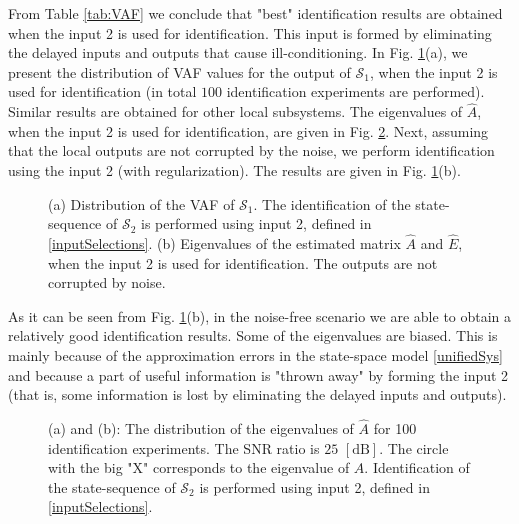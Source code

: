\documentclass[journal,10pt]{IEEEtran}
\begin{document}
From Table \ref{tab:VAF} we conclude that "best" identification results are obtained when the input 2 is used for identification. This input is formed by eliminating the delayed inputs and outputs that cause ill-conditioning. In Fig. \ref{fig:Nonoise}(a), we present the distribution of VAF values for the output of $\mathcal{S}_{1}$, when the input 2 is used for identification (in total $100$ identification experiments are performed). Similar results are obtained for other local subsystems. The eigenvalues of $\hat{A}$, when the input 2 is used for identification, are given in Fig. \ref{eigenvalues}. Next, assuming that the local outputs are not corrupted by the noise, we perform identification using the input 2 (with regularization). The results are given in Fig. \ref{fig:Nonoise}(b).
\begin{figure}[H]
\centering
 \;\;
 \;\;
 \caption{\small{(a) Distribution of the VAF of $\mathcal{S}_{1}$. The identification of the state-sequence of $\mathcal{S}_{2}$ is performed using input 2, defined in \eqref{inputSelections}. (b) Eigenvalues of the estimated matrix $\hat{A}$ and $\hat{E}$, when the input 2 is used for identification. The outputs are not corrupted by noise.}}
\label{fig:Nonoise}
\end{figure}
As it can be seen from Fig. \ref{fig:Nonoise}(b), in the noise-free scenario we are able to obtain a relatively good identification results. Some of the eigenvalues are biased. This is mainly because of the approximation errors in the state-space model \eqref{unifiedSys} and because a part of useful information is "thrown away" by forming the input 2 (that is, some information is lost by eliminating the delayed inputs and outputs).
\begin{figure}[H]
\centering
 \;\;
 \;\;
 \caption{\small{(a) and (b): The distribution of the eigenvalues of $\hat{A}$ for 100 identification experiments. The SNR ratio is $25$ $[\text{dB}]$. The circle with the big "X" corresponds to the eigenvalue of $A$. Identification of the state-sequence of $\mathcal{S}_{2}$ is performed using input 2, defined in \eqref{inputSelections}.}}
\label{eigenvalues}
\end{figure}
\end{document}
